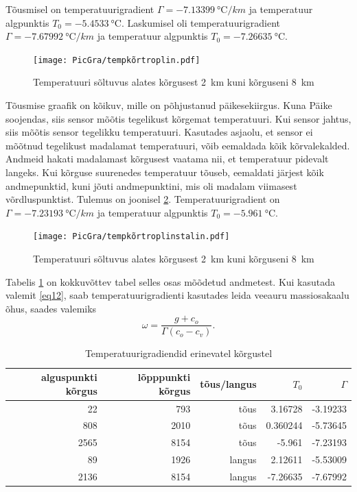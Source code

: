 \documentclass{trkut}%
\begin{document}
Tõusmisel on temperatuurigradient $\Gamma =\SI{-7.13399}{\degreeCelsius/km}$ ja temperatuur algpunktis $T_0 = \SI{-5.4533}{\celsius}$. Laskumisel oli temperatuurigradient $\Gamma =\SI{-7.67992}{\degreeCelsius/km}$ ja temperatuur algpunktis $T_0 = \SI{-7.26635}{\celsius}$.

\begin{figure}[h]
	\texttt{[image: PicGra/tempkõrtroplin.pdf]}
	\caption{Temperatuuri sõltuvus alates kõrgusest \SI{2}{km} kuni kõrguseni \SI{8}{km}}
	\label{tempkõrtroplin}%
\end{figure}

Tõusmise graafik on kõikuv, mille on põhjustanud päikesekiirgus. Kuna Päike soojendas, siis sensor mõõtis tegelikust kõrgemat temperatuuri. Kui sensor jahtus, siis mõõtis sensor tegelikku temperatuuri. Kasutades asjaolu, et sensor ei mõõtnud tegelikust madalamat temperatuuri, võib eemaldada kõik kõrvalekalded. Andmeid hakati madalamast kõrgusest vaatama nii, et temperatuur pidevalt langeks. Kui kõrguse suurenedes temperatuur tõuseb, eemaldati järjest kõik andmepunktid, kuni jõuti andmepunktini, mis oli madalam viimasest võrdluspunktist. Tulemus on joonisel \ref{tempkõrtroplinstalin}. Temperatuurigradient on $\Gamma =\SI{-7.23193}{\degreeCelsius/km}$ ja temperatuur algpunktis $T_0 = \SI{-5.961}{\celsius}$.

\begin{figure}[h]
	\texttt{[image: PicGra/tempkõrtroplinstalin.pdf]}
 	\caption{Temperatuuri sõltuvus alates kõrgusest \SI{2}{km} kuni kõrguseni \SI{8}{km}}
 	\label{tempkõrtroplinstalin}%
\end{figure}

Tabelis \ref{tabel1} on kokkuvõttev tabel selles osas mõõdetud andmetest. Kui kasutada valemit \ref{eq12}, saab temperatuurigradienti kasutades leida veeauru massiosakaalu õhus, saades valemiks
\begin{equation*}
\omega = \frac{g + c_o}{\Gamma(c_o-c_v)}.
\end{equation*}
\begin{table}[htb]
	\caption{Temperatuurigradiendid erinevatel kõrgustel}
	\label{tabel1}
	\begin{tabular}{r|r|r|r|r}
		\hline
		alguspunkti kõrgus & lõpppunkti kõrgus & tõus/langus & $T_0$ & $\Gamma$ \\
		\hline
		22 & 793 & tõus & 3.16728 & -3.19233 \\
		808 & 2010 & tõus & 0.360244 & -5.73645 \\
		2565 & 8154 & tõus & -5.961 & -7.23193 \\
		89 & 1926 & langus & 2.12611 & -5.53009 \\
		2136 & 8154 & langus & -7.26635 & -7.67992
	\end{tabular}
\end{table}
\end{document}
